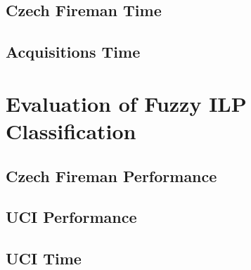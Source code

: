 \subsection{Czech Fireman Time}

\subsection{Acquisitions Time}

\section{Evaluation of Fuzzy ILP Classification}

\subsection{Czech Fireman Performance}

\subsection{UCI Performance}

\subsection{UCI Time}
